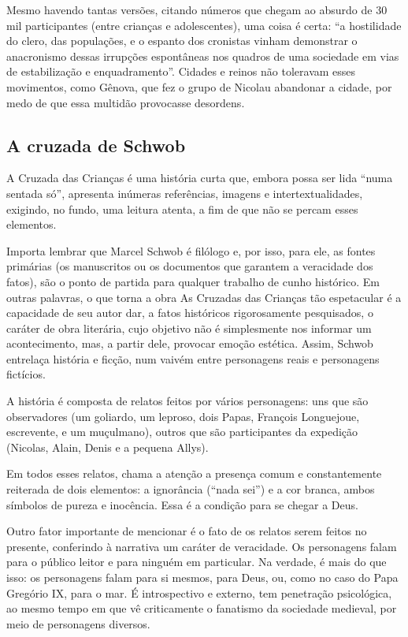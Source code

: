 \documentclass[12pt]{extarticle}
\begin{document}
Mesmo havendo tantas versões, citando números que chegam ao absurdo de
30 mil participantes (entre crianças e adolescentes), uma coisa é certa:
``a hostilidade do clero, das populações, e o espanto dos cronistas
vinham demonstrar o anacronismo dessas irrupções espontâneas nos quadros
de uma sociedade em vias de estabilização e enquadramento''. Cidades e
reinos não toleravam esses movimentos, como Gênova, que fez o grupo de
Nicolau abandonar a cidade, por medo de que essa multidão provocasse
desordens.

\subsection{A cruzada de Schwob}

A Cruzada das Crianças é uma história curta que, embora possa ser lida
``numa sentada só'', apresenta inúmeras referências, imagens e
intertextualidades, exigindo, no fundo, uma leitura atenta, a fim de que
não se percam esses elementos.

Importa lembrar que Marcel Schwob é filólogo e, por isso, para ele, as
fontes primárias (os manuscritos ou os documentos que garantem a
veracidade dos fatos), são o ponto de partida para qualquer trabalho de
cunho histórico. Em outras palavras, o que torna a obra As Cruzadas das
Crianças tão espetacular é a capacidade de seu autor dar, a fatos
históricos rigorosamente pesquisados, o caráter de obra literária, cujo
objetivo não é simplesmente nos informar um acontecimento, mas, a partir
dele, provocar emoção estética. Assim, Schwob entrelaça história e
ficção, num vaivém entre personagens reais e personagens fictícios.

A história é composta de relatos feitos por vários personagens: uns que
são observadores (um goliardo, um leproso, dois Papas, François
Longuejoue, escrevente, e um muçulmano), outros que são participantes da
expedição (Nicolas, Alain, Denis e a pequena Allys).

Em todos esses relatos, chama a atenção a presença comum e
constantemente reiterada de dois elementos: a ignorância (``nada sei'')
e a cor branca, ambos símbolos de pureza e inocência. Essa é a condição
para se chegar a Deus.

Outro fator importante de mencionar é o fato de os relatos serem feitos
no presente, conferindo à narrativa um caráter de veracidade. Os
personagens falam para o público leitor e para ninguém em particular. Na
verdade, é mais do que isso: os personagens falam para si mesmos, para
Deus, ou, como no caso do Papa Gregório IX, para o mar. É introspectivo
e externo, tem penetração psicológica, ao mesmo tempo em que vê
criticamente o fanatismo da sociedade medieval, por meio de personagens
diversos.
\end{document}
